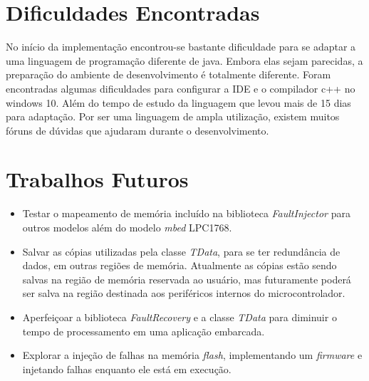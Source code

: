 \section{Dificuldades Encontradas}

No início da implementação encontrou-se bastante dificuldade para se adaptar a uma linguagem de programação diferente de java. Embora elas sejam parecidas, a preparação do ambiente de desenvolvimento é totalmente diferente. Foram encontradas algumas dificuldades para configurar a IDE e o compilador c++ no windows 10. Além do tempo de estudo da linguagem que levou mais de 15 dias para adaptação. Por ser uma linguagem de ampla utilização, existem muitos fóruns de dúvidas que ajudaram durante o desenvolvimento. 

\section{Trabalhos Futuros} \label{Sec:TrabalhosFuturos}

\begin{itemize}

\item Testar o mapeamento de memória incluído na biblioteca \textit{FaultInjector} para outros modelos além do modelo \textit{mbed} LPC1768.

\item Salvar as cópias utilizadas pela classe \textit{TData}, para se ter redundância de dados, em outras regiões de memória. Atualmente as cópias estão sendo salvas na região de memória reservada ao usuário, mas futuramente poderá ser salva na região destinada aos periféricos internos do microcontrolador. 

\item Aperfeiçoar a biblioteca \textit{FaultRecovery} e a classe \textit{TData} para diminuir o tempo de processamento em uma aplicação embarcada.

\item Explorar a injeção de falhas na memória \textit{flash}, implementando um \textit{firmware} e injetando falhas enquanto ele está em execução.

\end{itemize}
